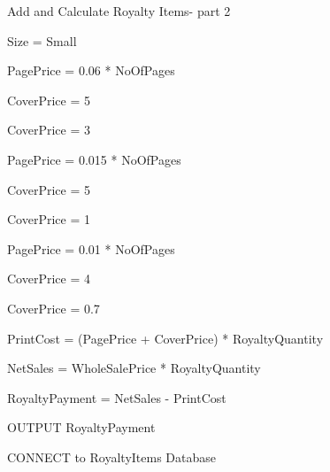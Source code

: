 \begin{algorithm}[H]
    \caption{Add and Calculate Royalty Items- part 2}
\begin{algorithmic}[1]


    Size = Small

    PagePrice = 0.06 * NoOfPages

        
        CoverPrice = 5
   
    \EndIf    


        CoverPrice = 3

    \EndIf

\EndIf



        PagePrice = 0.015 * NoOfPages

            
            CoverPrice = 5

        \EndIf

            
            CoverPrice = 1
    
        \EndIf   

    \EndIf
 

        PagePrice = 0.01 * NoOfPages

            
            CoverPrice = 4      

        \EndIf

            CoverPrice = 0.7

        \EndIf    
        
    \EndIf

\EndIf

PrintCost = (PagePrice + CoverPrice) * RoyaltyQuantity


    NetSales = WholeSalePrice * RoyaltyQuantity

    RoyaltyPayment = NetSales - PrintCost

    OUTPUT RoyaltyPayment

\EndIf

    
    CONNECT to RoyaltyItems Database
    
\EndIf

\end{algorithmic}
\end{algorithm}


